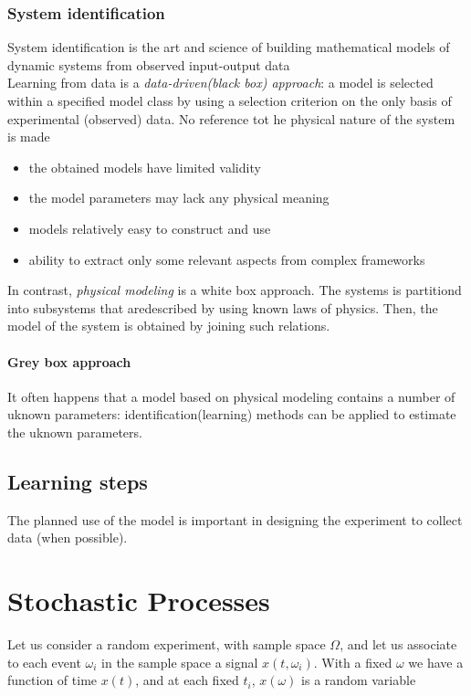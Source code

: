 \documentclass{book}
\theoremstyle{definition}
\theoremstyle{remark}
\theoremstyle{remark}
\begin{document}
\subsection{System identification}
System identification is the art and science of building mathematical models of dynamic systems from observed input-output data\\
Learning from data is a \emph{data-driven(black box) approach}: a model is selected within a specified model class by using a selection criterion on the only basis of experimental (observed) data. No reference tot he physical nature of the system is made
\begin{itemize}
    \item the obtained models have limited validity
    \item the model parameters may lack any physical meaning
    \item models relatively easy to construct and use
    \item ability to extract only some relevant aspects from complex frameworks
\end{itemize}

In contrast, \emph{physical modeling} is a white box approach. The systems is partitiond into subsystems that aredescribed by using known laws of physics. Then, the model of the system is obtained by joining such relations.

\subsubsection{Grey box approach}
It often happens that a model based on physical modeling contains a number of uknown parameters: identification(learning) methods can be applied to estimate the uknown parameters.

\section{Learning steps}
The planned use of the model is important in designing the experiment to collect data (when possible).





\chapter{Stochastic Processes}

Let us consider a random experiment, with sample space $\Omega$, and let us associate to each event $\omega_i$ in the sample space a signal $x(t,\omega_i)$. With a fixed $\omega$ we have a function of time $x(t)$, and at each fixed $t_i$, $x(\omega)$ is a random variable
\end{document}
